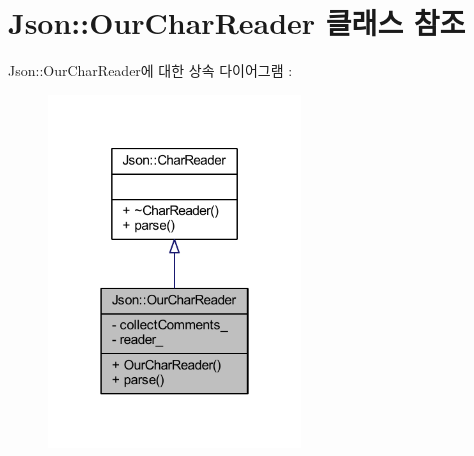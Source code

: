 \hypertarget{class_json_1_1_our_char_reader}{}\section{Json\+:\+:Our\+Char\+Reader 클래스 참조}
\label{class_json_1_1_our_char_reader}


Json\+:\+:Our\+Char\+Reader에 대한 상속 다이어그램 \+: \nopagebreak
\begin{figure}[H]
\begin{center}
\leavevmode
\includegraphics[width=190pt]{class_json_1_1_our_char_reader__inherit__graph}
\end{center}
\end{figure}


